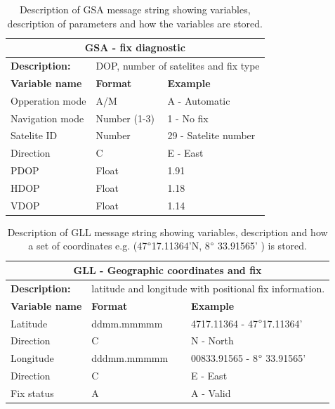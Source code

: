 \begin{table}[H]
	\centering
	\caption{Description of GSA message string showing variables, description of parameters and how the variables are stored.}
	\tiny
		\setlength{\extrarowheight}{5pt}
	\begin{tabular}{lll}
		\hline
		\hline
		\multicolumn{3}{c}{\textbf{GSA - fix diagnostic}}\\
		\hline
		\textbf{Description:} & \multicolumn{2}{l}{ DOP, number of satelites and fix type}\\
		\hline
		\hline
		\textbf{Variable name} & \textbf{Format}& \textbf{Example} \\
		
		Opperation mode & A/M & A - Automatic\\
		
		Navigation mode & Number (1-3) & 1 - No fix \\
		
		Satelite ID & Number & 29 - Satelite number \\
		
		Direction & C & E - East \\
		
		PDOP & Float & 1.91 \\
		
		HDOP & Float & 1.18 \\
		
		VDOP & Float & 1.14 \\
		\hline
		\hline
	\end{tabular}
	
	\label{tab:NMEA_GSA}
\end{table}

\begin{table}[H]
	\centering
	\caption{Description of GLL message string showing variables, description and how a set of coordinates e.g. (47$\degree$17.11364'N, 8$\degree$ 33.91565' ) is stored.}
	\setlength{\extrarowheight}{5pt}
	\tiny
	\begin{tabular}{lll}
		\hline
		\hline
		\multicolumn{3}{c}{\textbf{GLL - Geographic coordinates and fix}}\\
		\hline
		\textbf{Description:} & \multicolumn{2}{l}{ latitude and longitude with positional fix information.}\\
		\hline
		\hline
		\textbf{Variable name} & \textbf{Format}& \textbf{Example} \\
		
		Latitude & ddmm.mmmmm & 4717.11364 - 47$\degree$17.11364'\\
		
		Direction & C & N - North \\
		
		Longitude &dddmm.mmmmm & 00833.91565 - 8$\degree$ 33.91565' \\
		
		Direction & C & E - East \\
		
		Fix status & A & A - Valid\\
		\hline
		\hline
	\end{tabular}
	
	\label{tab:NMEA_GLL}
\end{table}

